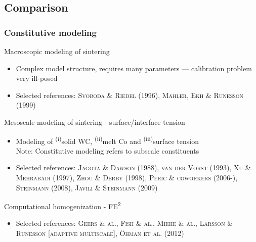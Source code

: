 \documentclass[11pt]{beamer} %
\newcommand{\roughcite}[1]{\textsc{#1}}
\begin{document}
\subsection{Comparison}
\begin{frame}
 \frametitle{Constitutive modeling}
 Macroscopic modeling of sintering
 \begin{itemize}
  \item Complex model structure, requires many parameters --- calibration problem very ill-posed
  \item Selected references: \roughcite{Svoboda \& Riedel (1996)}, \roughcite{Mähler, Ekh \& Runesson (1999)}
 \end{itemize}

Mesoscale modeling of sintering - surface/interface tension
 \begin{itemize}
 \item Modeling of \textsuperscript{(i)}solid WC, \textsuperscript{(ii)}melt Co and \textsuperscript{(iii)}surface tension\\
  Note: Constitutive modeling refers to subscale constituents
  \item Selected references: \roughcite{Jagota \& Dawson (1988)}, \roughcite{van der Vorst (1993)}, \roughcite{Xu \& Mehrabadi (1997)}, \roughcite{Zhou \& Derby (1998)}, \roughcite{Peric \& coworkers (2006-)}, \roughcite{Steinmann (2008)}, \roughcite{Javili \& Steinmann (2009)}
 \end{itemize}

Computational homogenization - FE\textsuperscript{2}
\begin{itemize}
  \item Selected references:  \roughcite{Geers \& al.},  \roughcite{Fish \& al.},
 \roughcite{Miehe \& al.}, \roughcite{Larsson \& Runesson [adaptive multiscale]}, \roughcite{Öhman et al. (2012)}
\end{itemize}
\end{frame}

\end{document}

